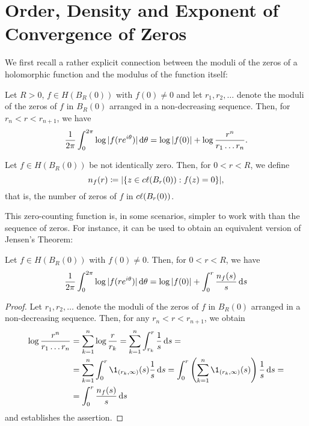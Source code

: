 \section{Order, Density and Exponent of Convergence of Zeros} \label{sec:zeros}


We first recall a rather explicit connection between the moduli of the zeros of a holomorphic function and the modulus of the function itself:

\begin{theorem}[Jensen] \label{thm:jensen}
    Let $R > 0$, $f \in H(B_R(0))$ with $f(0) \neq 0$ and let $r_1, r_2, \hdots$ denote the moduli of the zeros of $f$ in $B_{R}(0)$ arranged in a non-decreasing sequence. Then, for $r_n < r < r_{n+1}$, we have
    \begin{equation}
        \frac{1}{2 \pi} \int_0^{2\pi} \log \vert f(r e^{i \theta}) \vert \mathop{}\!\mathrm{d} \theta = \log \vert f(0) \vert + \log \frac{r^n}{r_1 \hdots r_n}.
    \end{equation}
\end{theorem}

\begin{definition}
    Let $f \in H(B_R(0))$ be not identically zero. Then, for $0 < r < R$, we define
    \begin{equation}
        n_f(r) \coloneqq \vert \{ z \in c\ell({B_r(0)}) : f(z) = 0 \} \vert,
    \end{equation}
    that is, the number of zeros of $f$ in $c\ell({B_{r}(0)})$.
\end{definition}

This zero-counting function is, in some scenarios, simpler to work with than the sequence of zeros. For instance, it can be used to obtain an equivalent version of Jensen's Theorem:

\begin{corollary} \label{cor:jensen-nf}
    Let $f \in H(B_R(0))$ with $f(0) \neq 0$. Then, for $0 < r < R$, we have
    \begin{equation}
        \frac{1}{2 \pi} \int_0^{2\pi} \log \vert f(re^{i \theta}) \vert \mathop{}\!\mathrm{d} \theta = \log \vert f(0) \vert + \int_0^r \frac{n_f(s)}{s} \mathop{}\!\mathrm{d} s
    \end{equation}
\end{corollary}

\begin{proof}
    Let $r_1, r_2, \hdots$ denote the moduli of the zeros of $f$ in $B_{R}(0)$ arranged in a non-decreasing sequence. Then, for any $r_n < r < r_{n+1}$, we obtain
    \begin{align*}
        \log \frac{r^n}{r_1 \hdots r_n} &= \sum_{k=1}^n \log \frac{r}{r_k} = \sum_{k=1}^n \int_{r_k}^r \frac{1}{s} \diff s = \\
        &= \sum_{k=1}^n \int_0^r \1_{(r_k, \infty)}(s) \frac{1}{s} \diff s = \int_0^r \left( \sum_{k=1}^n \1_{(r_k, \infty)}(s) \right) \frac{1}{s} \diff s = \\
        &= \int_0^r \frac{n_f(s)}{s} \diff s
    \end{align*}
    and  establishes the assertion.
\end{proof}

